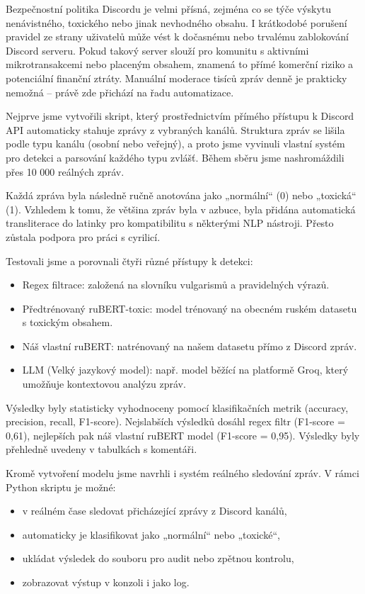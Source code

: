 \documentclass[FM,Proj]{tulthesis}
\begin{document}
Bezpečnostní politika Discordu je velmi přísná, zejména co se týče výskytu nenávistného, toxického nebo jinak nevhodného obsahu. I krátkodobé porušení pravidel ze strany uživatelů může vést k dočasnému nebo trvalému zablokování Discord serveru. Pokud takový server slouží pro komunitu s aktivními mikrotransakcemi nebo placeným obsahem, znamená to přímé komerční riziko a potenciální finanční ztráty. Manuální moderace tisíců zpráv denně je prakticky nemožná – právě zde přichází na řadu automatizace.

Nejprve jsme vytvořili skript, který prostřednictvím přímého přístupu k Discord API automaticky stahuje zprávy z vybraných kanálů. Struktura zpráv se lišila podle typu kanálu (osobní nebo veřejný), a proto jsme vyvinuli vlastní systém pro detekci a parsování každého typu zvlášť. Během sběru jsme nashromáždili přes 10 000 reálných zpráv.

Každá zpráva byla následně ručně anotována jako „normální“ (0) nebo „toxická“ (1). Vzhledem k tomu, že většina zpráv byla v azbuce, byla přidána automatická transliterace do latinky pro kompatibilitu s některými NLP nástroji. Přesto zůstala podpora pro práci s cyrilicí.

Testovali jsme a porovnali čtyři různé přístupy k detekci:

\begin{itemize}
    \item Regex filtrace: založená na slovníku vulgarismů a pravidelných výrazů.
    \item Předtrénovaný ruBERT-toxic: model trénovaný na obecném ruském datasetu s toxickým obsahem.
    \item Náš vlastní ruBERT: natrénovaný na našem datasetu přímo z Discord zpráv.
    \item LLM (Velký jazykový model): např. model běžící na platformě Groq, který umožňuje kontextovou analýzu zpráv.
\end{itemize}

Výsledky byly statisticky vyhodnoceny pomocí klasifikačních metrik (accuracy, precision, recall, F1-score). Nejslabších výsledků dosáhl regex filtr (F1-score = 0,61), nejlepších pak náš vlastní ruBERT model (F1-score = 0,95). Výsledky byly přehledně uvedeny v tabulkách s komentáři.

Kromě vytvoření modelu jsme navrhli i systém reálného sledování zpráv. V rámci Python skriptu je možné:

\begin{itemize}
    \item v reálném čase sledovat přicházející zprávy z Discord kanálů,
    \item automaticky je klasifikovat jako „normální“ nebo „toxické“,
    \item ukládat výsledek do souboru pro audit nebo zpětnou kontrolu,
    \item zobrazovat výstup v konzoli i jako log.
\end{itemize}
\end{document}
